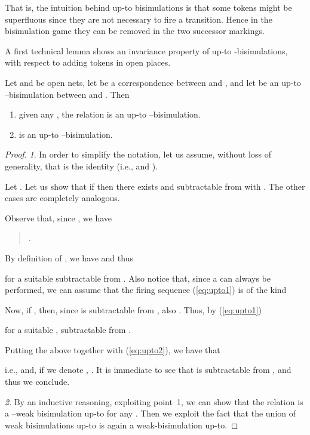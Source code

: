 \documentclass{LMCS}
\begin{document}
That is, the intuition behind up-to bisimulations is that some tokens
might be superfluous since they are not necessary to fire a
transition. Hence in the bisimulation game they can be removed in
the two successor markings.

A first technical lemma shows an invariance property of up-to
-bisimulations, with respect to adding tokens in open places.

\begin{lem}
  \label{le:up-to}
  Let  and  be open nets, let  be a correspondence between  and , and let
   be an up-to --bisimulation between  and
  . Then
  \begin{enumerate}[(1)]

  \item given any , the relation  is an up-to --bisimulation.

  \item  is an up-to --bisimulation.
  \end{enumerate}
\end{lem}


\begin{proof}

  \emph{1}. 
In order to simplify the notation, let us assume, without loss of
  generality, that  is the identity (i.e., 
  and ).

  Let . Let us show
  that if  then there exists  and  subtractable from
   with .
  The other cases are completely analogous.

  Observe that, since , we have
  \begin{quote}
    .
  \end{quote}
  By definition of , we have 
  and thus
  
  for a suitable  subtractable from .
  Also notice that, since a  can always be
  performed, we can assume that the firing sequence (\ref{eq:upto1})
  is of the kind
  
  
  Now, if , then, since  is
  subtractable from , also .
Thus, by (\ref{eq:upto1})
  
  for a suitable , subtractable from .

  Putting the above together with (\ref{eq:upto2}), we have that
  \begin{quote}
    
  \end{quote}
  i.e.,  and, if we
  denote , . It is immediate to
  see that  is subtractable from , and thus we
  conclude.

  \medskip
  
  \emph{2}.
By an inductive reasoning, exploiting point~1, we can show that
  the relation  is a
  --weak bisimulation up-to for any . Then we
  exploit the fact that the union of weak bisimulations up-to is again
  a weak-bisimulation up-to.
\end{proof}
\end{document}
